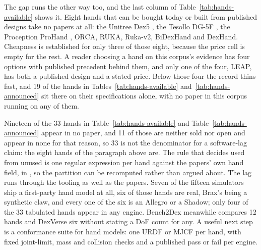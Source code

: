The gap runs the other way too, and the last column of Table~\ref{tab:hands-available} shows it.
Eight hands that can be bought today or built from published designs take no papers at all: the
Unitree Dex5 \cite{unitree_dex5_2025}, the Tesollo DG-5F \cite{tesollo_dg5f_2024}, the Proception
ProHand \cite{proception_prohand_2026}, ORCA, RUKA, Ruka-v2, BiDexHand and DexHand. Cheapness is
established for only three of those eight, because the price cell is empty for the rest. A reader
choosing a hand on this corpus's evidence has four options with published precedent behind them,
and only one of the four, LEAP, has both a published design and a stated price. Below those four
the record thins fast, and 19 of the hands in Tables~\ref{tab:hands-available}
and~\ref{tab:hands-announced} sit there on their specifications alone, with no paper in this
corpus running on any of them.

Nineteen of the 33 hands in Table~\ref{tab:hands-available} and
Table~\ref{tab:hands-announced} appear in no paper, and 11 of those are neither sold nor open
and appear in none for that reason, so 33 is not the denominator for a software-lag claim: the
eight hands of the paragraph above are. The rule that decides used from unused is one regular
expression per hand against the papers' own hand field, in , so the
partition can be recomputed rather than argued about. The lag runs through the tooling as well
as the papers. Seven of the fifteen simulators ship a first-party hand model at all, six of
those hands are real, Brax's being a synthetic claw, and every one of the six is an Allegro or
a Shadow; only four of the 33 tabulated hands appear in any engine. Bench2Dex
\cite{bench2dex_2026} meanwhile compares 12 hands and DexVerse \cite{dexverse_2026} six without
stating a DoF count for any. A useful next step is a conformance suite for hand models: one
URDF or MJCF per hand, with fixed joint-limit, mass and collision checks and a published pass
or fail per engine.